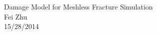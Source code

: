 \message{ !name(damage_note.tex)}\documentclass[11pt,fullpage]{article}
\begin{document}

\noindent
\begin{center}
{\bfA Damage Model for Meshless Fracture Simulation}
{\\ Fei Zhu \\ 15/28/2014}
\end{center}



\end{document}
